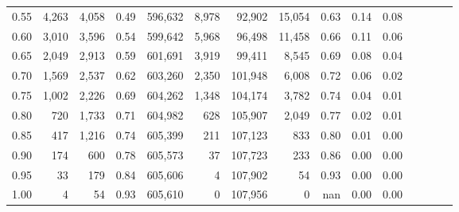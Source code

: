 \begin{tabular}{rrrcrrrrrrrrrrr}
0.55 &    4,263 &   4,058 &                                       0.49 &  596,632 &    8,978 &   92,902 &   15,054 &  0.63 &  0.14 &                         0.08 \\
0.60 &    3,010 &   3,596 &                                       0.54 &  599,642 &    5,968 &   96,498 &   11,458 &  0.66 &  0.11 &                         0.06 \\
0.65 &    2,049 &   2,913 &                                       0.59 &  601,691 &    3,919 &   99,411 &    8,545 &  0.69 &  0.08 &                         0.04 \\
0.70 &    1,569 &   2,537 &                                       0.62 &  603,260 &    2,350 &  101,948 &    6,008 &  0.72 &  0.06 &                         0.02 \\
0.75 &    1,002 &   2,226 &                                       0.69 &  604,262 &    1,348 &  104,174 &    3,782 &  0.74 &  0.04 &                         0.01 \\
0.80 &      720 &   1,733 &                                       0.71 &  604,982 &      628 &  105,907 &    2,049 &  0.77 &  0.02 &                         0.01 \\
0.85 &      417 &   1,216 &                                       0.74 &  605,399 &      211 &  107,123 &      833 &  0.80 &  0.01 &                         0.00 \\
0.90 &      174 &     600 &                                       0.78 &  605,573 &       37 &  107,723 &      233 &  0.86 &  0.00 &                         0.00 \\
0.95 &       33 &     179 &                                       0.84 &  605,606 &        4 &  107,902 &       54 &  0.93 &  0.00 &                         0.00 \\
1.00 &        4 &      54 &                                       0.93 &  605,610 &        0 &  107,956 &        0 &   nan &  0.00 &                         0.00 \\
\bottomrule
\end{tabular}
